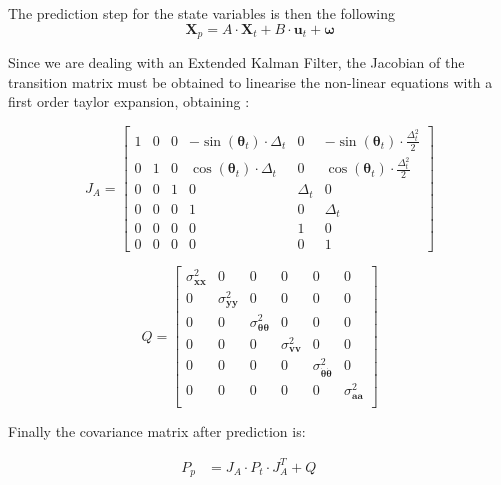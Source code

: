The prediction step for the state variables is then the following
\begin{equation}
\mathbf{X}_{p} = A \cdot \mathbf{X}_t + B \cdot \mathbf{u}_t + \boldsymbol \omega
\end{equation}

Since we are dealing with an Extended Kalman Filter, the Jacobian of the transition matrix must be obtained to linearise the non-linear equations with a first order taylor expansion, obtaining :

\begin{equation}
J_A
=
\begin{bmatrix} 

1 & 0 & 0 & -\sin(\boldsymbol \theta_t) \cdot \Delta_t & 0 & -\sin(\boldsymbol \theta_t) \cdot  \frac{\Delta_t^2 }{2} \\ 
0 & 1 & 0 & \cos(\boldsymbol \theta_t) \cdot \Delta_t & 0 & \cos(\boldsymbol \theta_t) \cdot  \frac{\Delta_t^2 }{2} \\ 
0 & 0 & 1 & 0 & \Delta_t & 0 \\ 
0 & 0 & 0 & 1 & 0 & \Delta_t \\ 
0 & 0 & 0 & 0 & 1 & 0 \\ 
0 & 0 & 0 & 0 & 0 & 1 
\end{bmatrix}
\end{equation}

\begin{equation}
Q
=
\begin{bmatrix} 
\sigma_{\mathbf{xx}}^2 & 0 & 0 & 0 & 0 & 0 \\ 
0 & \sigma_{\mathbf{yy}}^2 & 0 & 0 & 0 & 0 \\ 
0 & 0 & \sigma_{\mathbf{\boldsymbol \theta \boldsymbol \theta}}^2 & 0 & 0 & 0 \\ 
0 & 0 & 0 & \sigma_{\mathbf{vv}}^2 & 0 & 0 \\ 
0 & 0 & 0 & 0 & \sigma_{\mathbf{\dot{\boldsymbol \theta}\dot{\boldsymbol \theta}}}^2 & 0 \\ 
0 & 0 & 0 & 0 & 0 & \sigma_{\mathbf{aa}}^2 \\ 
\end{bmatrix}
\end{equation}

Finally the covariance matrix after prediction is:

\begin{align}
    P_{p} & = J_A \cdot P_t \cdot J_A^T + Q && \\
\end{align}


